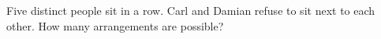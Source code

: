 Five distinct people sit in a row. Carl and Damian refuse to sit next to each other. How many arrangements are possible?

